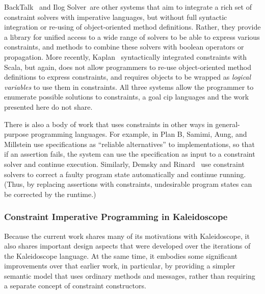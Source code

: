 BackTalk~\cite{roy1997reifying} and Ilog Solver~\DIFdelbegin {}\DIFdelend \DIFaddbegin {}\DIFaddend are other systems that aim to integrate a rich set of constraint
solvers with imperative languages, but without full syntactic
integration or re-using of object-oriented method definitions. Rather,
they provide a library for unified access to a wide range of solvers
to be able to express various constraints, and methods to combine
these solvers with boolean operators or
propagation.  More recently, Kaplan~\cite{koksal2012constraints} 
syntactically integrated constraints with Scala, but again, does not
allow programmers to re-use object-oriented method definitions to
express constraints, and requires objects to be wrapped as
\emph{logical variables} to use them in constraints. All three systems
allow the programmer to enumerate possible solutions to constraints, a
goal \ac{cip} languages and the work presented here do not share.

There is also a body of work that uses constraints in other ways in
general-purpose programming languages.  For example, 
in Plan B, Samimi, Aung, and
Millstein \cite{samimi-ecoop-2010} use specifications as ``reliable
alternatives'' to implementations, so that if an assertion fails, the
system can use the specification as input to a constraint solver and
continue execution.  Similarly, Demsky and Rinard~\cite{demsky2006goal}
use constraint solvers to correct a faulty program state automatically
and continue running.  (Thus, by replacing assertions with
constraints, undesirable program states can be corrected by the
runtime.)

\subsubsection*{Constraint Imperative Programming in Kaleidoscope}
Because the current work shares many of its motivations with
Kaleidoscope, it also shares important design aspects that were
developed over the iterations of the Kaleidoscope language.  At the
same time, it embodies some significant improvements over that earlier
work, in particular, by providing a simpler semantic model that uses
ordinary methods and messages, rather than requiring a separate
concept of constraint constructors.

